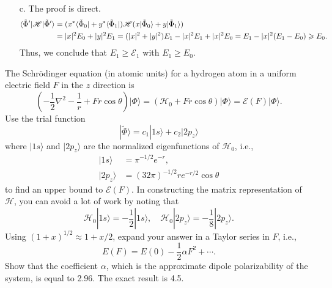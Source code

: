 \documentclass[a4paper]{book}
\newcounter{exercise}[chapter]
\newcounter{solution}[chapter]
\newcounter{eqs}[solution]
\begin{document}
\begin{solution}
\begin{enumerate}
	\item[c.] The proof is direct.	
	\begin{align*}
		\langle \tilde{\Phi}^\prime | \mathscr{H} | \tilde{\Phi}^\prime \rangle &= ( x^* \langle \tilde{\Phi}_0 | + y^* \langle \tilde{\Phi}_1 | ) \mathscr{H} ( x | \tilde{\Phi}_0 \rangle + y | \tilde{\Phi}_1 \rangle ) \notag \\
		&= |x|^2 E_0 + |y|^2 E_1 = ( |x|^2 + |y|^2 ) E_1 - |x|^2 E_1 + |x|^2 E_0 = E_1 - |x|^2 ( E_1 - E_0 ) \geqslant E_0. 
	\end{align*}
	Thus, we conclude that $E_1 \geq \mathscr{E}_1$ with $E_1 \geq E_0$.
	
	\end{enumerate}
			
	\end{solution}
	
	\begin{exercise}
	The Schr{\"o}dinger equation (in atomic units) for a hydrogen atom in a uniform electric field $F$ in the $z$ direction is
	\[
		\left( -\frac{1}{2}\nabla^2 - \frac{1}{r} + Fr\cos\theta \right) | \Phi \rangle = ( \mathscr{H}_0 + Fr \cos\theta ) | \Phi \rangle = \mathscr{E}(F) | \Phi \rangle.
	\]
	Use the trial function
	\[
		| \tilde{\Phi} \rangle = c_1 | 1s \rangle + c_2 | 2p_z \rangle
	\]
	where $|1s\rangle$ and $|2p_z\rangle$ are the normalized eigenfunctions of $\mathscr{H}_0$, i.e.,
	\begin{align*}
		| 1s \rangle &= \pi^{-1/2} e^{-r}, \\
		| 2p_z \rangle &= (32\pi)^{-1/2} r e^{-r/2} \cos\theta
	\end{align*}
	to find an upper bound to $\mathscr{E}(F)$. In constructing the matrix representation of $\mathscr{H}$, you can avoid a lot of work by noting that
	\[
		\mathscr{H}_0 | 1s \rangle = -\frac{1}{2} | 1s \rangle, \quad \mathscr{H}_0 | 2p_z \rangle = -\frac{1}{8} | 2p_z \rangle.
	\]
	Using $(1+x)^{1/2} \approx 1 + x/2$, expand your answer in a Taylor series in $F$, i.e.,
	\[
		E(F) = E(0) - \frac{1}{2} \alpha F^2 + \cdots.
	\]
	Show that the coefficient $\alpha$, which is the approximate dipole polarizability of the system, is equal to 2.96. The exact result is 4.5.
	\end{exercise}
	
\end{document}
